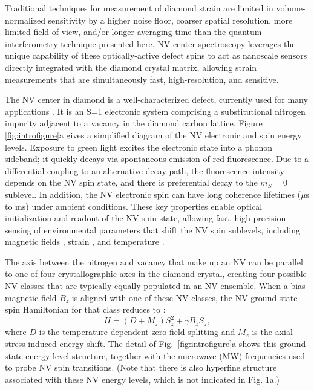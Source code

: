 \documentclass[reprint,superscriptaddress,hyphens,amsmath,amssymb,aps,prx,float]{revtex4-2}
\begin{document}
Traditional techniques for measurement of diamond strain are limited in volume-normalized sensitivity by a higher noise floor, coarser spatial resolution, more limited field-of-view, and/or longer averaging time than the quantum interferometry technique presented here.  NV center spectroscopy leverages the unique capability of these optically-active defect spins to act as nanoscale sensors directly integrated with the diamond crystal matrix, allowing strain measurements that are simultaneously fast, high-resolution, and sensitive.

The NV center in diamond is a well-characterized  \cite{MansonNVstructure2006,AcostaTemperatureDependence2010,DohertyPhysicsReports2013} defect, currently used for many applications \cite{RondinMagnetometry2014,NVNanoReview2014,BalasubramanianNVBioimaging2014,NVMRIreview2019,MorevaEnsembleThermometry2020}.  It is an S=1 electronic system comprising a substitutional nitrogen impurity adjacent to a vacancy in the diamond carbon lattice.  Figure \ref{fig:introfigure}a gives a simplified diagram of the NV electronic and spin energy levels.  Exposure to green light excites the electronic state into a phonon sideband; it quickly decays via spontaneous emission of red fluorescence.  Due to a differential coupling to an alternative decay path, the fluorescence intensity depends on the NV spin state, and there is preferential decay to the $m_S=0$ sublevel.  In addition, the NV electronic spin can have long coherence lifetimes ($\mu$s to ms) under ambient conditions.  These key properties enable optical initialization and readout of the NV spin state, allowing fast, high-precision sensing of environmental parameters that shift the NV spin sublevels, including magnetic fields \cite{NVimaging2008,SingleNVMagSensing2008,NVMagnetometer2008}, strain \cite{StrainPaper,AusStrain2019,EnglundStrain2016}, and temperature \cite{LukinThermometry2013,AwschalomThermometry2013,WrachtrupThermometry2013}.  

The axis between the nitrogen and vacancy that make up an NV can be parallel to one of four crystallographic axes in the diamond crystal, creating four possible NV classes that are typically equally populated in an NV ensemble.  When a bias magnetic field $B_z$ is aligned with one of these NV classes, the NV ground state spin Hamiltonian for that class reduces to \cite{StrainPaper}:
\begin{equation}
\label{eqn:ham}
    H=(D+M_z)S_{z}^2+\gamma B_z S_z,
\end{equation}
where $D$ is the temperature-dependent zero-field splitting and $M_z$ is the axial stress-induced energy shift.  The detail of Fig.~\ref{fig:introfigure}a shows this ground-state energy level structure, together with the microwave (MW) frequencies used to probe NV spin transitions.  (Note that there is also hyperfine structure associated with these NV energy levels, which is not indicated in Fig. 1a.)
\end{document}
